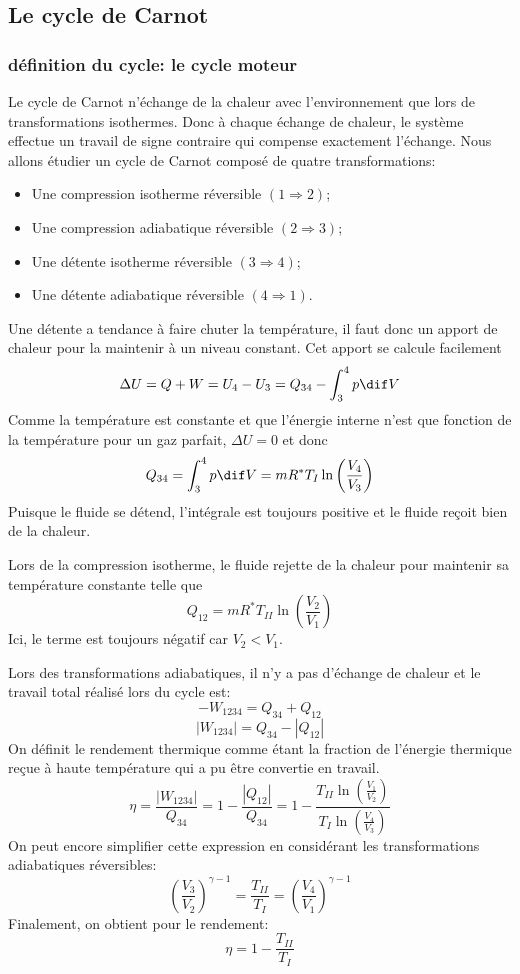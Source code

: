 
\subsection{Le cycle de Carnot}
\subsubsection{définition du cycle: le cycle moteur}
Le cycle de Carnot n'échange de la chaleur avec
l'environnement que lors de transformations isothermes.
Donc à chaque échange de chaleur, le système effectue
un travail de signe contraire qui compense exactement l'échange.
Nous allons étudier un cycle de Carnot composé de quatre transformations:
\begin{itemize}
  \item Une compression isotherme réversible $(1 \Rightarrow 2)$;
  \item Une compression adiabatique réversible $(2 \Rightarrow 3)$;
  \item Une détente isotherme réversible $( 3 \Rightarrow 4)$;
  \item Une détente adiabatique réversible $( 4 \Rightarrow 1)$.
\end{itemize}

Une détente a tendance à faire chuter la température,
il faut donc un apport de chaleur pour la maintenir à un niveau constant.
Cet apport se calcule facilement
\[ \Delta U = Q + W = U_4-U_3 = Q_{34} - \int_3^4 p\dif V \]
Comme la température est constante et que l'énergie interne n'est que
fonction de la température pour un gaz parfait, $\Delta U = 0$ et donc
\[ Q_{34} = \int_3^4 p\dif V = mR^*T_I \ln \left(\frac{V_4}{V_3} \right) \]
Puisque le fluide se détend,
l'intégrale est toujours positive et le fluide reçoit bien de la chaleur.

Lors de la compression isotherme, le fluide rejette de la chaleur pour
maintenir sa température constante telle que
\[ Q_{12} = mR^*T_{II} \ln \left(\frac{V_2}{V_1} \right) \]
Ici, le terme est toujours négatif car $V_2 < V_1$.

Lors des transformations adiabatiques,
il n'y a pas d'échange de chaleur et le travail total réalisé lors du cycle est:
\[ -W_{1234} = Q_{34} + Q_{12} \]
\[ |W_{1234}| = Q_{34}-|Q_{12}| \]
On définit le rendement thermique comme étant la fraction de l'énergie
thermique reçue à haute température qui a pu être convertie en travail.
\[ \eta = \frac {|W_{1234}|}{Q_{34}} = 1-\frac {|Q_{12}|}{Q_{34}} =
1-\frac{T_{II} \ln \left(\frac{V_1}{V_2}\right)}{T_I
\ln \left(\frac{V_4}{V_3} \right)} \]
On peut encore simplifier cette expression en considérant
les transformations adiabatiques réversibles:
\[ \left(\frac{V_3}{V_2}\right)^{\gamma -1} =
\frac {T_{II}}{T_I} = \left(\frac{V_4}{V_1} \right)^{\gamma -1} \]
Finalement, on obtient pour le rendement:
\[  \eta = 1 -\frac{T_{II}}{T_I} \]

